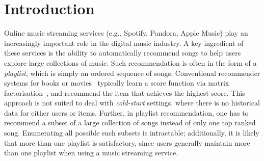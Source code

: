
\section{Introduction}
\label{sec:intro}
Online music streaming services (e.g., Spotify, Pandora, Apple Music) %
play an increasingly important role in the digital music industry.
A key ingredient of these services is the ability to automatically recommend songs to help users explore large collections of music.
Such recommendation is often in the form of a \emph{playlist}, which is simply an ordered sequence of songs.
%
Conventional recommender systems for books or movies~\citep{Sarwar:2001,Netflix}
typically learn a score function via matrix factorisation~\citep{Koren:2009},
and recommend the item that achieves the highest score.
This approach is not suited to deal with \emph{cold-start} settings,
where there is no historical data for either users or items.
%
Further, in playlist recommendation,
one has to recommend a subset of a large collection of songs instead of only one top ranked song.
Enumerating all possible such subsets is intractable;
additionally,
it is likely that more than one playlist is satisfactory, since
users generally maintain more than one playlist when using a music streaming service.


